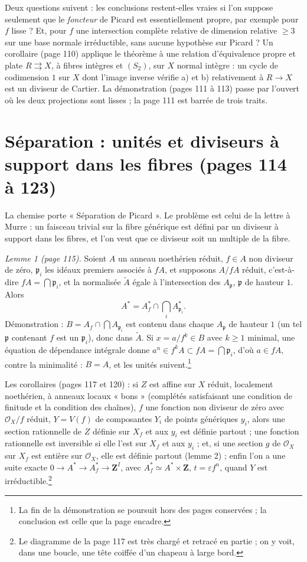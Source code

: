 \documentclass[11pt,a4paper]{article}
\begin{document}
Deux questions suivent : les conclusions restent-elles vraies si l'on suppose
seulement que le \emph{foncteur} de Picard est essentiellement propre, par
exemple pour $f$ lisse ? Et, pour $f$ une intersection complète relative de
dimension relative $\geq 3$ sur une base normale irréductible, sans aucune
hypothèse sur Picard ? Un corollaire (page 110) applique le théorème à une
relation d'équivalence propre et plate $R \rightrightarrows X$, à fibres
intègres et $(S_2)$, sur $X$ normal intègre : un cycle de codimension $1$ sur
$X$ dont l'image inverse vérifie a) et b) relativement à $R \to X$ est un
diviseur de Cartier. La démonstration (pages 111 à 113) passe par l'ouvert où
les deux projections sont lisses ; la page 111 est barrée de trois traits.

\section*{Séparation : unités et diviseurs à support dans les fibres (pages 114 à 123)}

La chemise porte « Séparation de Picard ». Le problème est celui de la lettre à
Murre : un faisceau trivial sur la fibre générique est défini par un diviseur
à support dans les fibres, et l'on veut que ce diviseur soit un multiple de la
fibre.

\emph{Lemme 1 (page 115).} Soient $A$ un anneau noethérien réduit, $f \in A$ non
diviseur de zéro, $\mathfrak{p}_i$ les idéaux premiers associés à $fA$, et
supposons $A/fA$ réduit, c'est-à-dire $fA = \bigcap \mathfrak{p}_i$, et la
normalisée $\tilde{A}$ égale à l'intersection des $A_{\mathfrak{p}}$, $\mathfrak{p}$
de hauteur $1$. Alors
\[
A^* = A_f^* \cap \bigcap_i A^*_{\mathfrak{p}_i} .
\]
Démonstration : $B = A_f \cap \bigcap A_{\mathfrak{p}_i}$ est contenu dans
chaque $A_{\mathfrak{p}}$ de hauteur $1$ (un tel $\mathfrak{p}$ contenant $f$
est un $\mathfrak{p}_i$), donc dans $\tilde{A}$. Si $x = a/f^k \in B$ avec
$k \geq 1$ minimal, une équation de dépendance intégrale donne
$a^n \in f^kA \subset fA = \bigcap \mathfrak{p}_i$, d'où $a \in fA$, contre la
minimalité : $B = A$, et les unités suivent.\footnote{La fin de la démonstration
se poursuit hors des pages conservées ; la conclusion est celle que la page
encadre.}

Les corollaires (pages 117 et 120) : si $Z$ est affine sur $X$ réduit,
localement noethérien, à anneaux locaux « bons » (complétés satisfaisant une
condition de finitude et la condition des chaînes), $f$ une fonction non
diviseur de zéro avec $\mathcal{O}_X/f$ réduit, $Y = V(f)$ de composantes
$Y_i$ de points génériques $y_i$, alors une section rationnelle de $Z$ définie
sur $X_f$ et aux $y_i$ est définie partout ; une fonction rationnelle est
inversible si elle l'est sur $X_f$ et aux $y_i$ ; et, si une section $g$ de $\mathcal{O}_X$ sur $X_f$ est entière sur
$\mathcal{O}_X$, elle est définie partout (lemme 2) ; enfin l'on a une suite
exacte $0 \to A^* \to A_f^* \to \mathbf{Z}^I$, avec
$A_f^* \simeq A^* \times \mathbf{Z}$, $t = \varepsilon f^n$, quand $Y$ est
irréductible.\footnote{Le diagramme de la page 117 est très chargé et retracé
en partie ; on y voit, dans une boucle, une tête coiffée d'un chapeau à large
bord.}
\end{document}
